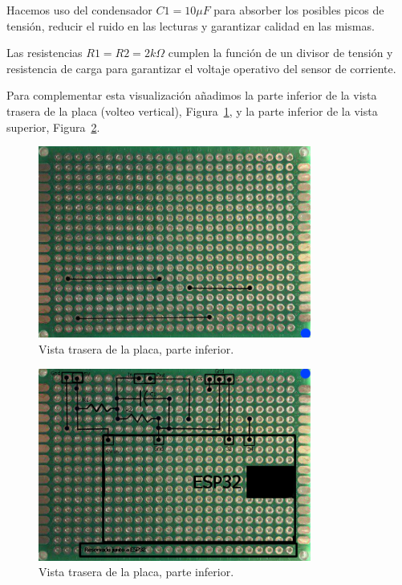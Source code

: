 \documentclass[a4paper,10pt]{article}
\begin{document}
Hacemos uso del condensador $C1 = 10\mu F$ para absorber los
posibles picos de tensión, reducir el ruido en las lecturas y
garantizar calidad en las mismas.

Las resistencias $R1=R2=2k\Omega$ cumplen la función de un divisor de
tensión y resistencia de carga para garantizar el voltaje operativo
del sensor de corriente.

Para complementar esta visualización añadimos la parte inferior de la
vista trasera de la placa (volteo vertical), Figura~\ref{fig:placa-tras-inf},
y la parte inferior de la vista superior, Figura~\ref{fig:placa-sup-inf}.

\begin{figure}
  \centering
  \includegraphics[width=0.8\textwidth]{img/dibujo_placa_vista_inferior_parte_trasera.png}
  \caption{Vista trasera de la placa, parte inferior.}\label{fig:placa-tras-inf}
\end{figure}

\begin{figure}
  \centering
  \includegraphics[width=0.8\textwidth]{img/dibujo_placa_vista_superior_parte_trasera.png}
  \caption{Vista trasera de la placa, parte inferior.}\label{fig:placa-sup-inf}
\end{figure}
\end{document}
